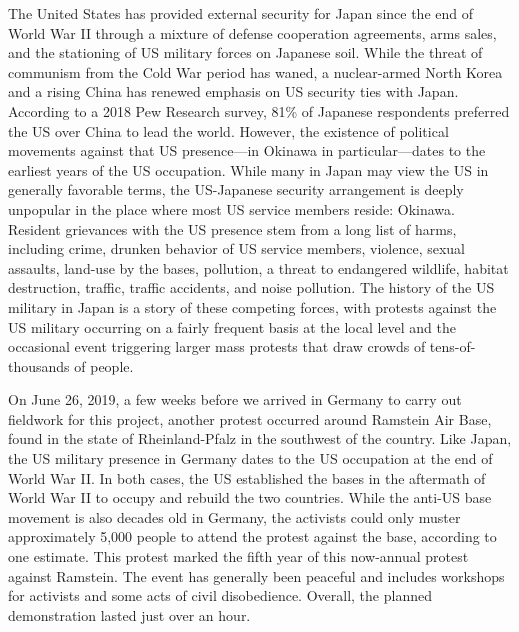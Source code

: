 The United States has provided external security for Japan since the end of World War II through a mixture of defense cooperation agreements, arms sales, and the stationing of US military forces on Japanese soil. While the threat of communism from the Cold War period has waned, a nuclear-armed North Korea and a rising China has renewed emphasis on US security ties with Japan. According to a 2018 Pew Research survey, 81\% of Japanese respondents preferred the US over China to lead the world.\autocite{StokesandDevlin2018} However, the existence of political movements against that US presence---in Okinawa in particular---dates to the earliest years of the US occupation.\autocite{cottrellmoorer1977,akibayashi2009} While many in Japan  may view the US in generally favorable terms, the US-Japanese security arrangement is deeply unpopular in the place where most US service members reside: Okinawa. Resident grievances with the US presence stem from a long list of harms, including crime, drunken behavior of US service members, violence, sexual assaults, land-use by the bases, pollution, a threat to endangered wildlife, habitat destruction, traffic, traffic accidents, and noise pollution.   The history of the US military in Japan is a story of these competing forces, with protests against the US military occurring on a fairly frequent basis at the local level and the occasional event triggering larger mass protests that draw crowds of tens-of-thousands of people. 

On June 26, 2019, a few weeks before we arrived in Germany  to carry out fieldwork for this project, another protest occurred around Ramstein Air Base, found in the state of Rheinland-Pfalz in the southwest of the country. Like Japan, the US military presence in Germany dates to the US occupation at the end of World War II. In both cases, the US established the bases in the aftermath of World War II to occupy and rebuild the two countries. While the anti-US base movement is also decades old in Germany, the activists could only muster approximately 5,000 people to attend the protest against the base, according to one estimate.\autocite{berlinone20190723} This protest marked the fifth year of this now-annual protest against Ramstein. The event has generally been peaceful and includes workshops for activists and some acts of civil disobedience. Overall, the planned demonstration lasted just over an hour.

